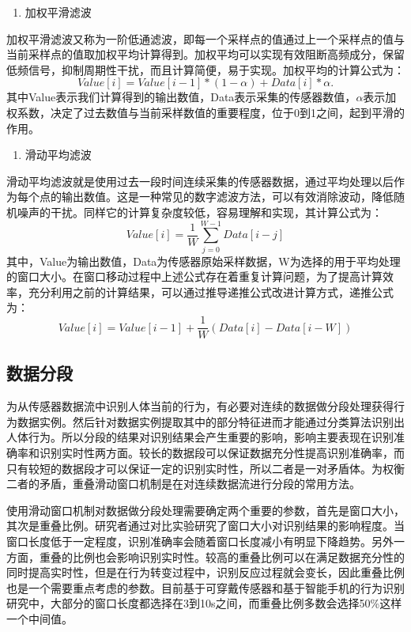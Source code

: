 \begin{enumerate}[(1)]
	\item 加权平滑滤波
\end{enumerate}
\par 加权平滑滤波又称为一阶低通滤波，即每一个采样点的值通过上一个采样点的值与当前采样点的值取加权平均计算得到。加权平均可以实现有效阻断高频成分，保留低频信号，抑制周期性干扰，而且计算简便，易于实现。加权平均的计算公式为：
\begin{equation}
	Value[i] = Value[i-1]*(1-\alpha) + Data[i]*\alpha.
\end{equation}
其中Value表示我们计算得到的输出数值，Data表示采集的传感器数值，$\alpha$表示加权系数，决定了过去数值与当前采样数值的重要程度，位于0到1之间，起到平滑的作用。

\begin{enumerate}[(2)]
	\item 滑动平均滤波
\end{enumerate}

\par 滑动平均滤波就是使用过去一段时间连续采集的传感器数据，通过平均处理以后作为每个点的输出数值。这是一种常见的数字滤波方法，可以有效消除波动，降低随机噪声的干扰。同样它的计算复杂度较低，容易理解和实现，其计算公式为：
\begin{equation}
	Value[i] = \frac{1}{W}\sum_{j=0}^{W-1}Data[i-j]
\end{equation}
其中，Value为输出数值，Data为传感器原始采样数据，W为选择的用于平均处理的窗口大小。在窗口移动过程中上述公式存在着重复计算问题，为了提高计算效率，充分利用之前的计算结果，可以通过推导递推公式改进计算方式，递推公式为：
\begin{equation}
	Value[i] = Value[i-1] + \frac{1}{W}(Data[i] - Data[i-W])
\end{equation}

\subsection{数据分段}
\par 为从传感器数据流中识别人体当前的行为，有必要对连续的数据做分段处理获得行为数据实例。然后针对数据实例提取其中的部分特征进而才能通过分类算法识别出人体行为。所以分段的结果对识别结果会产生重要的影响，影响主要表现在识别准确率和识别实时性两方面。较长的数据段可以保证数据充分性提高识别准确率，而只有较短的数据段才可以保证一定的识别实时性，所以二者是一对矛盾体。为权衡二者的矛盾，重叠滑动窗口机制是在对连续数据流进行分段的常用方法。
\par 使用滑动窗口机制对数据做分段处理需要确定两个重要的参数，首先是窗口大小，其次是重叠比例。研究者通过对比实验研究了窗口大小对识别结果的影响程度。当窗口长度低于一定程度，识别准确率会随着窗口长度减小有明显下降趋势。另外一方面，重叠的比例也会影响识别实时性。较高的重叠比例可以在满足数据充分性的同时提高实时性，但是在行为转变过程中，识别反应过程就会变长，因此重叠比例也是一个需要重点考虑的参数。目前基于可穿戴传感器和基于智能手机的行为识别研究中，大部分的窗口长度都选择在3到10s之间，而重叠比例多数会选择50\%这样一个中间值。

